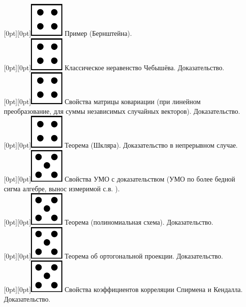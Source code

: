 \documentclass[10pt]{article}
\begin{document}
\raisebox{-1pt}[0pt][0pt]{\includegraphics[width=0.02\linewidth]{4.png}}  Пример (Бернштейна). \\

\raisebox{-1pt}[0pt][0pt]{\includegraphics[width=0.02\linewidth]{4.png}} Классическое неравенство Чебышёва. Доказательство. \\

\raisebox{-1pt}[0pt][0pt]{\includegraphics[width=0.02\linewidth]{4.png}} Свойства матрицы ковариации (при линейном преобразование, для суммы независимых случайных векторов). Доказательство. \\

\raisebox{-1pt}[0pt][0pt]{\includegraphics[width=0.02\linewidth]{4.png}} Теорема (Шкляра). Доказательство в непрерывном случае. \\

\raisebox{-1pt}[0pt][0pt]{\includegraphics[width=0.02\linewidth]{5.png}} Свойства УМО с доказательством (УМО по более бедной сигма алгебре, вынос измеримой с.в. ). \\

\raisebox{-1pt}[0pt][0pt]{\includegraphics[width=0.02\linewidth]{5.png}} Теорема (полиномиальная схема). Доказательство. \\

\raisebox{-1pt}[0pt][0pt]{\includegraphics[width=0.02\linewidth]{5.png}} Теорема об ортогональной проекции. Доказательство. \\

\raisebox{-1pt}[0pt][0pt]{\includegraphics[width=0.02\linewidth]{5.png}} Свойства коэффициентов корреляции Спирмена и Кендалла. Доказательство. \\ 
\end{document}
